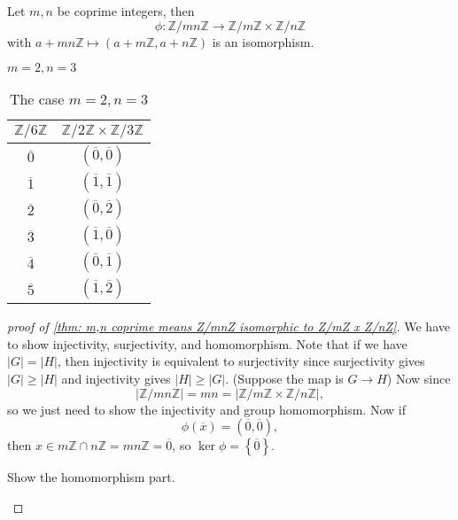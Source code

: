 \begin{theorem} \label{thm: m,n coprime means Z/mnZ isomorphic to Z/mZ x Z/nZ}
    Let \(m, n\) be coprime integers, then 
    \[
        \phi : \mathbb{Z} / mn \mathbb{Z} \to \mathbb{Z} / m \mathbb{Z} \times \mathbb{Z} / n \mathbb{Z} 
    \] with \(a + mn \mathbb{Z} \mapsto (a + m \mathbb{Z} , a + n\mathbb{Z} )\) is an isomorphism. 
\end{theorem}

\begin{eg}
    \(m = 2, n = 3\) 
\end{eg}
\begin{table}[H]
    \centering
    \begin{tabular}{c|c}
        \toprule
            \(\mathbb{Z} / 6 \mathbb{Z} \)  & \(\mathbb{Z} / 2 \mathbb{Z}  \times \mathbb{Z} / 3 \mathbb{Z} \)   \\
        \midrule
            \(\overline{0} \)  & \(\left( \overline{0}, \overline{0}   \right) \)   \\
            \(\overline{1} \) & \(\left( \overline{1}, \overline{1}   \right) \)  \\
            \(\overline{2} \) & \(\left( \overline{0}, \overline{2}   \right) \)  \\
            \(\overline{3} \)  & \(\left( \overline{1}, \overline{0}   \right) \)  \\
            \(\overline{4} \)  &\(\left( \overline{0}, \overline{1}   \right) \)  \\
            \(\overline{5} \)  & \(\left( \overline{1}, \overline{2}   \right) \)  \\
        \bottomrule
    \end{tabular}
    \caption{The case \(m=2, n=3\)}
    \label{tab:Z6Z isomorphic to Z2Z Z3Z}
\end{table}

\begin{proof}[proof of \autoref{thm: m,n coprime means Z/mnZ isomorphic to Z/mZ x Z/nZ}]
    We have to show injectivity, surjectivity, and homomorphism. Note that if we have \(\vert G \vert = \vert H \vert  \), then injectivity is equivalent to surjectivity since surjectivity gives \(\vert G \vert \ge \vert H \vert \) and injectivity gives \(\vert H \vert \ge \vert G \vert \). (Suppose the map is \(G \to H\)) Now since 
    \[
        \left\vert \mathbb{Z} / mn \mathbb{Z}  \right\vert = mn = \left\vert \mathbb{Z} / m \mathbb{Z} \times \mathbb{Z} / n \mathbb{Z}  \right\vert,  
    \] so we just need to show the injectivity and group homomorphism. Now if 
    \[
        \phi \left( \overline{x}  \right) = (\overline{0}, \overline{0}),  
    \] then \(x \in m\mathbb{Z} \cap n \mathbb{Z} = mn \mathbb{Z} = \overline{0} \), so \(\ker \phi = \left\{ \overline{0}  \right\} \). 
    
    \begin{exercise}
        Show the homomorphism part.
    \end{exercise}
\end{proof}


